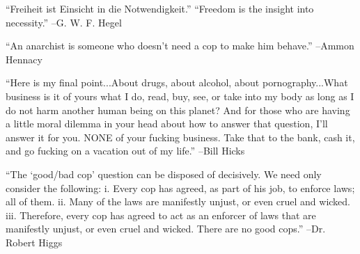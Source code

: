 \documentclass{article}%
\begin{document}
\linebreak%
\vspace{1mm}%
\begin{minipage}{\textwidth}%
\flushleft%
“Freiheit ist Einsicht in die Notwendigkeit.”%
\linebreak%
\vspace{1mm}%
“Freedom is the insight into necessity.”%
\linebreak%
–G. W. F. Hegel%
\linebreak%
\vspace{1mm}%
\end{minipage}%
\linebreak%
\vspace{1mm}%
\begin{minipage}{\textwidth}%
\flushleft%
“An anarchist is someone who doesn't need a cop to make him behave.”%
\linebreak%
\vspace{1mm}%
–Ammon Hennacy%
\linebreak%
\vspace{1mm}%
\end{minipage}%
\linebreak%
\vspace{1mm}%
\begin{minipage}{\textwidth}%
\flushleft%
“Here is my final point...About drugs, about alcohol, about pornography...What business is it of yours what I do, read, buy, see, or take into my body as long as I do not harm another human being on this planet? And for those who are having a little moral dilemma in your head about how to answer that question, I'll answer it for you. NONE of your fucking business. Take that to the bank, cash it, and go fucking on a vacation out of my life.”%
\linebreak%
\vspace{1mm}%
–Bill Hicks%
\linebreak%
\vspace{1mm}%
\end{minipage}%
\linebreak%
\vspace{1mm}%
\begin{minipage}{\textwidth}%
\flushleft%
“The ‘good/bad cop’ question can be disposed of decisively. We need only consider the  following:  i. Every cop has agreed, as part of his job, to enforce laws; all of them.  ii. Many of the laws are manifestly unjust, or even cruel and wicked.  iii. Therefore, every cop has agreed to act as an enforcer of laws that are manifestly unjust, or even cruel and wicked.  There are no good cops.”%
\linebreak%
\vspace{1mm}%
–Dr. Robert Higgs%
\linebreak%
\vspace{1mm}%
\end{minipage}%
\end{document}
